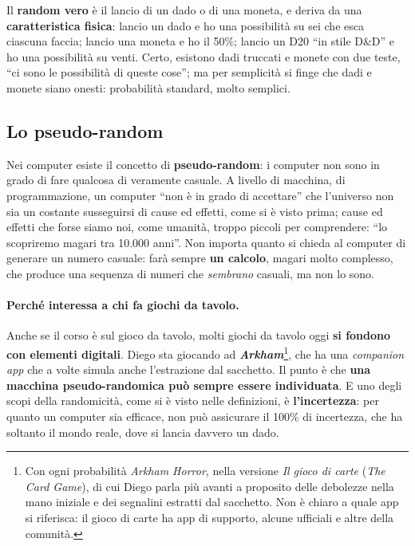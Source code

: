 Il \textbf{random vero} è il lancio di un dado o di una moneta, e deriva da una
\textbf{caratteristica fisica}: lancio un dado e ho una possibilità su sei che esca ciascuna
faccia; lancio una moneta e ho il 50\%; lancio un D20 ``in stile D\&D'' e ho una possibilità
su venti. Certo, esistono dadi truccati e monete con due teste, ``ci sono le possibilità di
queste cose''; ma per semplicità si finge che dadi e monete siano onesti: probabilità
standard, molto semplici.

\subsection{Lo pseudo-random}

Nei computer esiste il concetto di \textbf{pseudo-random}: i computer non sono in grado di
fare qualcosa di veramente casuale. A livello di macchina, di programmazione, un computer
``non è in grado di accettare'' che l'universo non sia un costante susseguirsi di cause ed
effetti, come si è visto prima; cause ed effetti che forse siamo noi, come umanità, troppo
piccoli per comprendere: ``lo scopriremo magari tra 10.000 anni''. Non importa quanto si
chieda al computer di generare un numero casuale: farà sempre \textbf{un calcolo}, magari
molto complesso, che produce una sequenza di numeri che \emph{sembrano} casuali, ma non lo
sono.

\paragraph{Perché interessa a chi fa giochi da tavolo.} Anche se il corso è sul gioco da
tavolo, molti giochi da tavolo oggi \textbf{si fondono con elementi digitali}. Diego sta
giocando ad \textbf{\emph{Arkham}}\footnote{Con ogni probabilità \emph{Arkham Horror}, nella
versione \emph{Il gioco di carte} (\emph{The Card Game}), di cui Diego parla più avanti a
proposito delle debolezze nella mano iniziale e dei segnalini estratti dal sacchetto. Non è
chiaro a quale app si riferisca: il gioco di carte ha app di supporto, alcune ufficiali e
altre della comunità.}, che ha una \emph{companion app} che a volte simula anche
l'estrazione dal sacchetto. Il punto è che \textbf{una macchina pseudo-randomica può sempre
essere individuata}. E uno degli scopi della randomicità, come si è visto nelle definizioni,
è \textbf{l'incertezza}: per quanto un computer sia efficace, non può assicurare il 100\% di
incertezza, che ha soltanto il mondo reale, dove si lancia davvero un dado.

